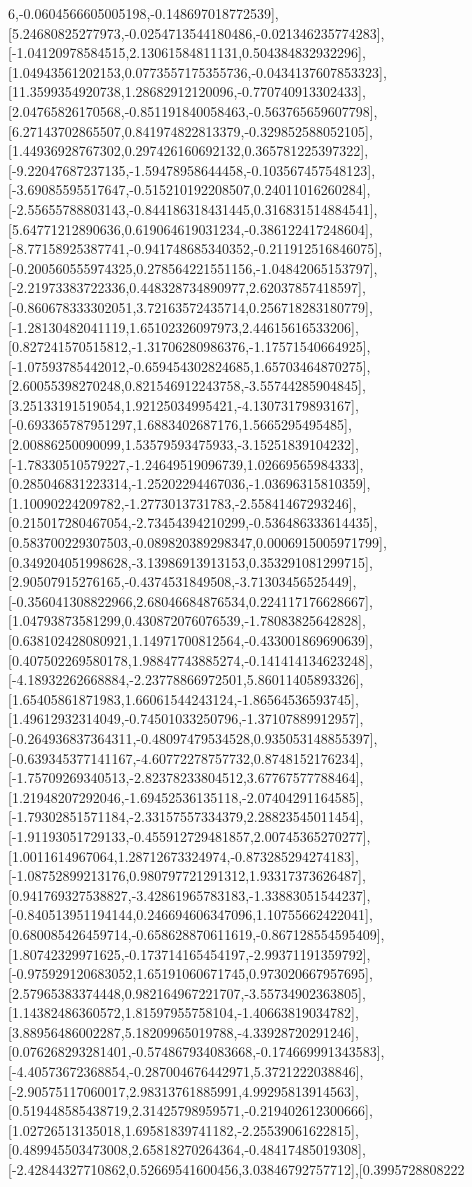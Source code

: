 \documentclass{article}
\begin{document}
6,-0.0604566605005198,-0.148697018772539],[5.24680825277973,-0.0254713544180486,-0.021346235774283],[-1.04120978584515,2.13061584811131,0.504384832932296],[1.04943561202153,0.0773557175355736,-0.0434137607853323],[11.3599354920738,1.28682912120096,-0.770740913302433],[2.04765826170568,-0.851191840058463,-0.563765659607798],[6.27143702865507,0.841974822813379,-0.329852588052105],[1.44936928767302,0.297426160692132,0.365781225397322],[-9.22047687237135,-1.59478958644458,-0.103567457548123],[-3.69085595517647,-0.515210192208507,0.24011016260284],[-2.55655788803143,-0.844186318431445,0.316831514884541],[5.64771212890636,0.619064619031234,-0.386122417248604],[-8.77158925387741,-0.941748685340352,-0.211912516846075],[-0.200560555974325,0.278564221551156,-1.04842065153797],[-2.21973383722336,0.448328734890977,2.62037857418597],[-0.860678333302051,3.72163572435714,0.256718283180779],[-1.28130482041119,1.65102326097973,2.44615616533206],[0.827241570515812,-1.31706280986376,-1.17571540664925],[-1.07593785442012,-0.659454302824685,1.65703464870275],[2.60055398270248,0.821546912243758,-3.55744285904845],[3.25133191519054,1.92125034995421,-4.13073179893167],[-0.693365787951297,1.6883402687176,1.5665295495485],[2.00886250090099,1.53579593475933,-3.15251839104232],[-1.78330510579227,-1.24649519096739,1.02669565984333],[0.285046831223314,-1.25202294467036,-1.03696315810359],[1.10090224209782,-1.2773013731783,-2.55841467293246],[0.215017280467054,-2.73454394210299,-0.536486333614435],[0.583700229307503,-0.089820389298347,0.0006915005971799],[0.349204051998628,-3.13986913913153,0.353291081299715],[2.90507915276165,-0.4374531849508,-3.71303456525449],[-0.356041308822966,2.68046684876534,0.224117176628667],[1.04793873581299,0.430872076076539,-1.78083825642828],[0.638102428080921,1.14971700812564,-0.433001869690639],[0.407502269580178,1.98847743885274,-0.141414134623248],[-4.18932262668884,-2.23778866972501,5.86011405893326],[1.65405861871983,1.66061544243124,-1.86564536593745],[1.49612932314049,-0.74501033250796,-1.37107889912957],[-0.264936837364311,-0.48097479534528,0.935053148855397],[-0.639345377141167,-4.60772278757732,0.8748152176234],[-1.75709269340513,-2.82378233804512,3.67767577788464],[1.21948207292046,-1.69452536135118,-2.07404291164585],[-1.79302851571184,-2.33157557334379,2.28823545011454],[-1.91193051729133,-0.455912729481857,2.00745365270277],[1.0011614967064,1.28712673324974,-0.873285294274183],[-1.08752899213176,0.980797721291312,1.93317373626487],[0.941769327538827,-3.42861965783183,-1.33883051544237],[-0.840513951194144,0.246694606347096,1.10755662422041],[0.680085426459714,-0.658628870611619,-0.867128554595409],[1.80742329971625,-0.173714165454197,-2.99371191359792],[-0.975929120683052,1.65191060671745,0.973020667957695],[2.57965383374448,0.982164967221707,-3.55734902363805],[1.14382486360572,1.81597955758104,-1.40663819034782],[3.88956486002287,5.18209965019788,-4.33928720291246],[0.076268293281401,-0.574867934083668,-0.174669991343583],[-4.40573672368854,-0.287004676442971,5.3721222038846],[-2.90575117060017,2.98313761885991,4.99295813914563],[0.519448585438719,2.31425798959571,-0.219402612300666],[1.02726513135018,1.69581839741182,-2.25539061622815],[0.489945503473008,2.65818270264364,-0.48417485019308],[-2.42844327710862,0.52669541600456,3.03846792757712],[0.3995728808222
\end{document}
